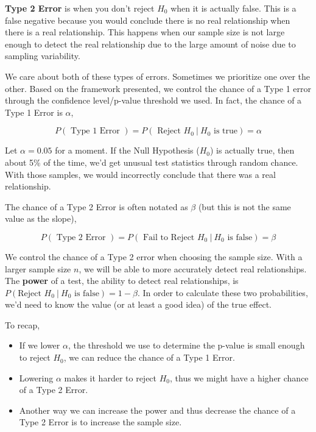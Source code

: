 \documentclass[
]{book}
\providecommand{\tightlist}{%
  \setlength{\itemsep}{0pt}\setlength{\parskip}{0pt}}
\begin{document}
\textbf{Type 2 Error} is when you don't reject \(H_0\) when it is actually false. This is a false negative because you would conclude there is no real relationship when there is a real relationship. This happens when our sample size is not large enough to detect the real relationship due to the large amount of noise due to sampling variability.

We care about both of these types of errors. Sometimes we prioritize one over the other. Based on the framework presented, we control the chance of a Type 1 error through the confidence level/p-value threshold we used. In fact, the chance of a Type 1 Error is \(\alpha\),

\[P(\text{ Type 1 Error }) = P(\text{ Reject }H_0 ~|~H_0\text{ is true} ) =  \alpha\]

Let \(\alpha = 0.05\) for a moment. If the Null Hypothesis (\(H_0\)) is actually true, then about 5\% of the time, we'd get unusual test statistics through random chance. With those samples, we would incorrectly conclude that there was a real relationship.

The chance of a Type 2 Error is often notated as \(\beta\) (but this is not the same value as the slope),

\[P(\text{ Type 2 Error }) = P(\text{ Fail to Reject }H_0 ~|~H_0\text{ is false} ) =  \beta\]

We control the chance of a Type 2 error when choosing the sample size. With a larger sample size \(n\), we will be able to more accurately detect real relationships. The \textbf{power} of a test, the ability to detect real relationships, is \(P(\text{Reject }H_0 ~|~H_0\text{ is false}) = 1 - \beta\). In order to calculate these two probabilities, we'd need to know the value (or at least a good idea) of the true effect.

To recap,

\begin{itemize}
\tightlist
\item
  If we lower \(\alpha\), the threshold we use to determine the p-value is small enough to reject \(H_0\), we can reduce the chance of a Type 1 Error.
\item
  Lowering \(\alpha\) makes it harder to reject \(H_0\), thus we might have a higher chance of a Type 2 Error.
\item
  Another way we can increase the power and thus decrease the chance of a Type 2 Error is to increase the sample size.
\end{itemize}
\end{document}
